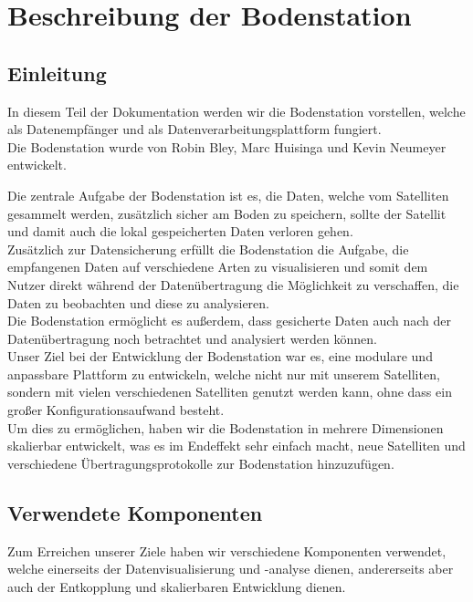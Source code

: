 \section{Beschreibung der Bodenstation}
\subsection{Einleitung}
In diesem Teil der Dokumentation werden wir die Bodenstation vorstellen, welche als Datenempfänger und als Datenverarbeitungsplattform fungiert. \\
Die Bodenstation wurde von Robin Bley, Marc Huisinga und Kevin Neumeyer entwickelt.

Die zentrale Aufgabe der Bodenstation ist es, die Daten, welche vom Satelliten gesammelt werden, zusätzlich sicher am Boden zu speichern, sollte der Satellit und damit auch die lokal gespeicherten Daten verloren gehen. \\
Zusätzlich zur Datensicherung erfüllt die Bodenstation die Aufgabe, die empfangenen Daten auf verschiedene Arten zu visualisieren und somit dem Nutzer direkt während der Datenübertragung die Möglichkeit zu verschaffen, die Daten zu beobachten und diese zu analysieren. \\
Die Bodenstation ermöglicht es außerdem, dass gesicherte Daten auch nach der Datenübertragung noch betrachtet und analysiert werden können. \\
Unser Ziel bei der Entwicklung der Bodenstation war es, eine modulare und anpassbare Plattform zu entwickeln, welche nicht nur mit unserem Satelliten, sondern mit vielen verschiedenen Satelliten genutzt werden kann, ohne dass ein großer Konfigurationsaufwand besteht. \\
Um dies zu ermöglichen, haben wir die Bodenstation in mehrere Dimensionen skalierbar entwickelt, was es im Endeffekt sehr einfach macht, neue Satelliten und verschiedene Übertragungsprotokolle zur Bodenstation hinzuzufügen.

\subsection{Verwendete Komponenten}
Zum Erreichen unserer Ziele haben wir verschiedene Komponenten verwendet, welche einerseits der Datenvisualisierung und -analyse dienen, andererseits aber auch der Entkopplung und skalierbaren Entwicklung dienen.

